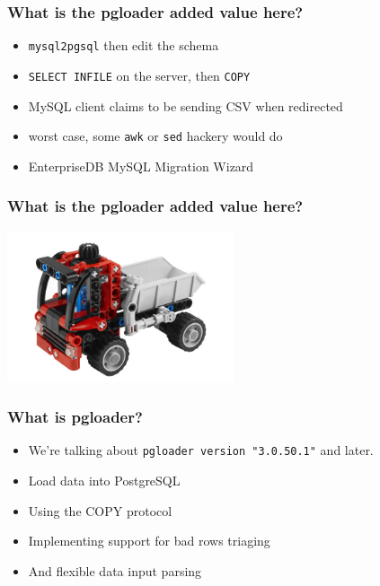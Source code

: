 \documentclass{beamer}
\begin{document}
\begin{frame}[fragile]
  \frametitle{What is the pgloader added value here?}
  
  \vfill

  \begin{itemize}
  \item \texttt{mysql2pgsql} then edit the schema
  \item \texttt{SELECT INFILE} on the server, then \texttt{COPY}
  \item MySQL client claims to be sending CSV when redirected
  \item worst case, some \texttt{awk} or \texttt{sed} hackery would do
  \item EnterpriseDB MySQL Migration Wizard
  \end{itemize}  
\end{frame}

\begin{frame}[fragile]
  \frametitle{What is the pgloader added value here?}
  
  \vfill

\begin{center}
  \includegraphics[height=12em]{toy-loader.jpg}
\end{center}
\end{frame}

\begin{frame}[fragile]
  \frametitle{What is pgloader?}
  
  \vfill

  \begin{itemize}
  \item We're talking about \texttt{pgloader version "3.0.50.1"} and later.
  \item Load data into PostgreSQL
  \item Using the COPY protocol
  \item Implementing support for bad rows triaging
  \item And flexible data input parsing
  \end{itemize}  
\end{frame}
\end{document}
